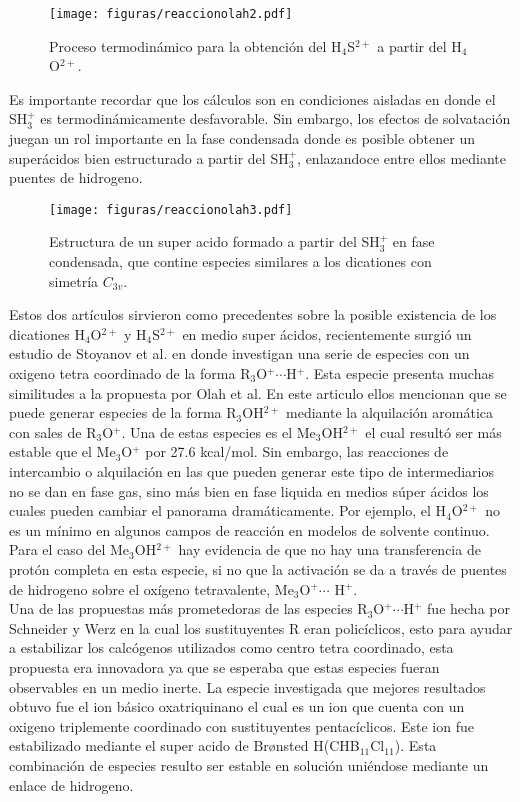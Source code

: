 \documentclass[12pt]{report}
\begin{document}
\begin{figure}[h]
\centering
\texttt{[image: figuras/reaccionolah2.pdf]} 
\caption{Proceso termodinámico para la obtención del H$_4$S$^{2+}$ a partir del H$_4$O$^{2+}$.\cite{Olah1988}}
\end{figure}


Es importante recordar que los cálculos son en condiciones aisladas en donde el SH$_3^+$ es termodinámicamente desfavorable. Sin embargo, los efectos de solvatación juegan un rol importante en la fase condensada donde es posible obtener un superácidos bien estructurado a partir del SH$_3^+$, enlazandoce entre ellos mediante puentes de hidrogeno.

\begin{figure}[h]
\centering
\texttt{[image: figuras/reaccionolah3.pdf]} 
\caption{Estructura de un super acido formado a partir del SH$_3^+$ en fase condensada, que contine especies similares a los dicationes con simetría $C_{3v}$.\cite{Olah1988}}
\end{figure}

\newpage
Estos dos artículos sirvieron como precedentes sobre la posible existencia de los dicationes H$_4$O$^{2+}$ y H$_4$S$^{2+}$ en medio super ácidos, recientemente surgió un estudio de Stoyanov et al.\cite{Stoyanov2012} en donde investigan una serie de especies con un oxigeno tetra coordinado de la forma R$_3$O$^+\dotsi$H$^+$. Esta especie presenta muchas similitudes a la propuesta por Olah et al. En este articulo ellos mencionan que se puede generar especies de la forma R$_3$OH$^{2+}$ mediante la alquilación aromática con sales de R$_3$O$^+$. Una de estas especies es el Me$_3$OH$^{2+}$ el cual resultó ser más estable que el Me$_3$O$^+$ por 27.6 kcal/mol. Sin embargo, las reacciones de intercambio o alquilación en las que pueden generar este tipo de intermediarios no se dan en fase gas, sino más bien en fase liquida en medios súper ácidos los cuales pueden cambiar el panorama dramáticamente. Por ejemplo, el H$_4$O$^{2+}$ no es un mínimo en algunos campos de reacción en modelos de solvente continuo. Para el caso del Me$_3$OH$^{2+}$ hay evidencia de que no hay una transferencia de protón completa en esta especie, si no que la activación se da a través de puentes de hidrogeno sobre el oxígeno tetravalente, Me$_3$O$^+\dotsi$ H$^+$.
\\


Una de las propuestas más prometedoras de las especies R$_3$O$^+\dotsi$H$^+$ fue hecha por Schneider y Werz\cite{Schneider2010} en la cual los sustituyentes R eran policíclicos, esto para ayudar a estabilizar los calcógenos utilizados como centro tetra coordinado, esta propuesta era innovadora ya que se esperaba que estas especies fueran observables en un medio inerte. La especie investigada que mejores resultados obtuvo fue el ion básico oxatriquinano el cual es un ion que cuenta con un oxigeno triplemente coordinado con sustituyentes pentacíclicos. Este ion fue estabilizado mediante el super acido de Br\o nsted H(CHB$_{11}$Cl$_{11}$). Esta combinación de especies resulto ser estable en solución uniéndose mediante un enlace de hidrogeno\cite{Stoyanov2012}. 
\end{document}
